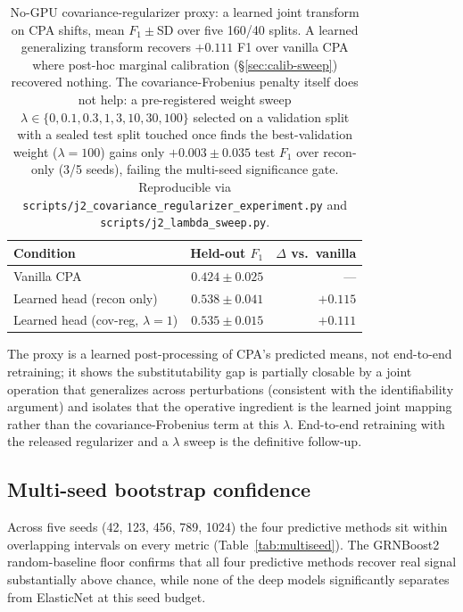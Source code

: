 \documentclass{article}
\theoremstyle{plain}
\theoremstyle{definition}
\theoremstyle{remark}
\begin{document}
\begin{table}[h]
\centering
\small
\begin{tabular}{lrr}
\toprule
\textbf{Condition} & \textbf{Held-out $F_1$} & \textbf{$\Delta$ vs.\ vanilla} \\
\midrule
Vanilla CPA              & $0.424 \pm 0.025$ & --- \\
Learned head (recon only) & $0.538 \pm 0.041$ & $+0.115$ \\
Learned head (cov-reg, $\lambda{=}1$) & $0.535 \pm 0.015$ & $+0.111$ \\
\bottomrule
\end{tabular}
\caption{No-GPU covariance-regularizer proxy: a learned joint transform on CPA shifts, mean $F_1\pm$SD over five 160/40 splits. A learned generalizing transform recovers $+0.111$ F1 over vanilla CPA where post-hoc marginal calibration (\S\ref{sec:calib-sweep}) recovered nothing. The covariance-Frobenius penalty itself does not help: a pre-registered weight sweep $\lambda\in\{0,0.1,0.3,1,3,10,30,100\}$ selected on a validation split with a sealed test split touched once finds the best-validation weight ($\lambda{=}100$) gains only $+0.003\pm0.035$ test $F_1$ over recon-only (3/5 seeds), failing the multi-seed significance gate. Reproducible via \texttt{scripts/j2\_covariance\_regularizer\_experiment.py} and \texttt{scripts/j2\_lambda\_sweep.py}.}
\label{tab:j2}
\end{table}

The proxy is a learned post-processing of CPA's predicted means, not end-to-end retraining; it shows the substitutability gap is partially closable by a joint operation that generalizes across perturbations (consistent with the identifiability argument) and isolates that the operative ingredient is the learned joint mapping rather than the covariance-Frobenius term at this $\lambda$. End-to-end retraining with the released regularizer and a $\lambda$ sweep is the definitive follow-up.

\subsection{Multi-seed bootstrap confidence}
\label{app:multi_seed}
Across five seeds (42, 123, 456, 789, 1024) the four predictive methods sit within overlapping intervals on every metric (Table~\ref{tab:multiseed}). The GRNBoost2 random-baseline floor confirms that all four predictive methods recover real signal substantially above chance, while none of the deep models significantly separates from ElasticNet at this seed budget.
\end{document}
